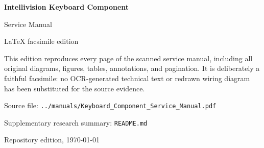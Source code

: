 \documentclass[letterpaper,11pt]{article}
\begin{document}
\begin{titlepage}
  \centering
  \vspace*{0.18\textheight}
  {\LARGE\bfseries Intellivision Keyboard Component\par}
  \vspace{0.4em}
  {\Large Service Manual\par}
  \vspace{1.5em}
  {\large LaTeX facsimile edition\par}
  \vfill
  \begin{minipage}{0.82\textwidth}
    \small
    This edition reproduces every page of the scanned service manual,
    including all original diagrams, figures, tables, annotations, and
    pagination. It is deliberately a faithful facsimile: no OCR-generated
    technical text or redrawn wiring diagram has been substituted for the
    source evidence.

    \medskip
    Source file:\newline
    \texttt{../manuals/Keyboard\_Component\_Service\_Manual.pdf}

    \medskip
    Supplementary research summary:\newline
    \texttt{README.md}
  \end{minipage}
  \vfill
  {\small Repository edition, \today\par}
\end{titlepage}


\end{document}
